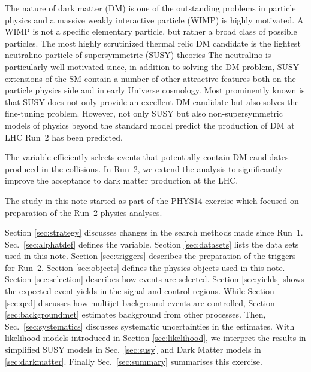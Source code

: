 The nature of dark matter (DM) is one of the outstanding problems in
particle physics and a massive weakly interactive particle (WIMP) is highly motivated. 
A WIMP is not a specific elementary particle, but rather a broad class of possible particles.
The most highly scrutinized thermal relic DM candidate is the lightest neutralino particle of supersymmetric (SUSY) theories  The
neutralino is particularly well-motivated since, in addition to solving the DM problem, SUSY extensions of the SM contain a number 
of other attractive features both on the particle physics side and in early Universe cosmology. Most prominently known is that 
SUSY does not only provide an excellent DM candidate but also solves the fine-tuning problem.
However, not only SUSY but also non-supersymmetric models of physics beyond the standard model predict the production of DM at 
LHC Run~2 has been predicted. 

The \alphat variable
efficiently selects events that potentially contain DM candidates
produced in the collisions. In Run~2, we extend the \alphat analysis
to significantly improve the acceptance to dark matter production at
the LHC.

The study in this note started as part of the PHYS14 exercise
\cite{PHYS14} which focused on preparation of the Run~2 physics analyses. 

Section \ref{sec:strategy} discusses changes in the search methods
made since Run~1. Sec.~\ref{sec:alphatdef} defines the \alphat
variable.  Section \ref{sec:datasets} lists the data sets used in this
note.  Section \ref{sec:triggers} describes the preparation of the
triggers for Run~2. Section \ref{sec:objects} defines the physics
objects used in this note. Section \ref{sec:selection} describes how
events are selected. Section \ref{sec:yields} shows the expected event
yields in the signal and control regions. While Section \ref{sec:qcd}
discusses how multijet background events are controlled, Section
\ref{sec:backgroundmet} estimates background from other
processes. Then, Sec.~\ref{sec:systematics} discusses systematic
uncertainties in the estimates. With likelihood models introduced in
Section \ref{sec:likelihood}, we interpret the results in simplified
SUSY models in Sec.~\ref{sec:susy} and Dark Matter models in
\ref{sec:darkmatter}. Finally Sec.~\ref{sec:summary} summarises this
exercise.

